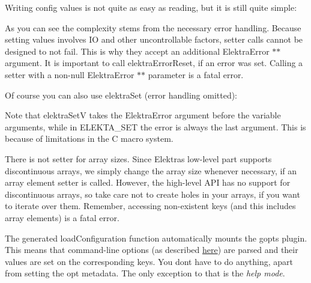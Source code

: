 Writing config values is not quite as easy as reading, but it is still quite simple\+:


\begin{DoxyCode}{0}
\DoxyCodeLine{    \textcolor{comment}{// handle error}}
\DoxyCodeLine{\}}
\end{DoxyCode}


As you can see the complexity stems from the necessary error handling. Because setting values involves IO and other uncontrollable factors, setter calls cannot be designed to not fail. This is why they accept an additional {\ttfamily Elektra\+Error $\ast$$\ast$} argument. It is important to call {\ttfamily elektra\+Error\+Reset}, if an error was set. Calling a setter with a non-\/null {\ttfamily Elektra\+Error $\ast$$\ast$} parameter is a fatal error.

Of course you can also use {\ttfamily elektra\+Set} (error handling omitted)\+:


\begin{DoxyCode}{0}
\end{DoxyCode}


Note that {\ttfamily elektra\+SetV} takes the {\ttfamily Elektra\+Error} argument before the variable arguments, while in {\ttfamily E\+L\+E\+K\+T\+A\+\_\+\+S\+ET} the error is always the last argument. This is because of limitations in the C macro system.

There is not setter for array sizes. Since Elektra\textquotesingle{}s low-\/level part supports discontinuous arrays, we simply change the array size whenever necessary, if an array element setter is called. However, the high-\/level A\+PI has no support for discontinuous arrays, so take care not to create holes in your arrays, if you want to iterate over them. Remember, accessing non-\/existent keys (and this includes array elements) is a fatal error.

The generated {\ttfamily load\+Configuration} function automatically mounts the {\ttfamily gopts} plugin. This means that command-\/line options (as described \mbox{\hyperlink{doc_tutorials_command-line-options_md}{here}}) are parsed and their values are set on the corresponding keys. You don\textquotesingle{}t have to do anything, apart from setting the {\ttfamily opt} metadata. The only exception to that is the {\itshape help mode}.

